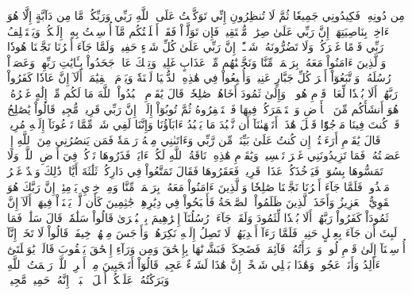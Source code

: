 مِن دُونِهِۦۖ فَكِيدُونِي جَمِيعٗا ثُمَّ لَا تُنظِرُونِ
إِنِّي تَوَكَّلۡتُ عَلَى ٱللَّهِ رَبِّي وَرَبِّكُمۚ مَّا مِن دَآبَّةٍ إِلَّا هُوَ ءَاخِذُۢ بِنَاصِيَتِهَآۚ إِنَّ رَبِّي عَلَىٰ صِرَٰطٖ مُّسۡتَقِيمٖ
فَإِن تَوَلَّوۡاْ فَقَدۡ أَبۡلَغۡتُكُم مَّآ أُرۡسِلۡتُ بِهِۦٓ إِلَيۡكُمۡۚ وَيَسۡتَخۡلِفُ رَبِّي قَوۡمًا غَيۡرَكُمۡ وَلَا تَضُرُّونَهُۥ شَيۡـًٔاۚ إِنَّ رَبِّي عَلَىٰ كُلِّ شَيۡءٍ حَفِيظٞ
وَلَمَّا جَآءَ أَمۡرُنَا نَجَّيۡنَا هُودٗا وَٱلَّذِينَ ءَامَنُواْ مَعَهُۥ بِرَحۡمَةٖ مِّنَّا وَنَجَّيۡنَٰهُم مِّنۡ عَذَابٍ غَلِيظٖ
وَتِلۡكَ عَادٞۖ جَحَدُواْ بِـَٔايَٰتِ رَبِّهِمۡ وَعَصَوۡاْ رُسُلَهُۥ وَٱتَّبَعُوٓاْ أَمۡرَ كُلِّ جَبَّارٍ عَنِيدٖ
وَأُتۡبِعُواْ فِي هَٰذِهِ ٱلدُّنۡيَا لَعۡنَةٗ وَيَوۡمَ ٱلۡقِيَٰمَةِۗ أَلَآ إِنَّ عَادٗا كَفَرُواْ رَبَّهُمۡۗ أَلَا بُعۡدٗا لِّعَادٖ قَوۡمِ هُودٖ
۞وَإِلَىٰ ثَمُودَ أَخَاهُمۡ صَٰلِحٗاۚ قَالَ يَٰقَوۡمِ ٱعۡبُدُواْ ٱللَّهَ مَا لَكُم مِّنۡ إِلَٰهٍ غَيۡرُهُۥۖ هُوَ أَنشَأَكُم مِّنَ ٱلۡأَرۡضِ وَٱسۡتَعۡمَرَكُمۡ فِيهَا فَٱسۡتَغۡفِرُوهُ ثُمَّ تُوبُوٓاْ إِلَيۡهِۚ إِنَّ رَبِّي قَرِيبٞ مُّجِيبٞ
قَالُواْ يَٰصَٰلِحُ قَدۡ كُنتَ فِينَا مَرۡجُوّٗا قَبۡلَ هَٰذَآۖ أَتَنۡهَىٰنَآ أَن نَّعۡبُدَ مَا يَعۡبُدُ ءَابَآؤُنَا وَإِنَّنَا لَفِي شَكّٖ مِّمَّا تَدۡعُونَآ إِلَيۡهِ مُرِيبٖ
قَالَ يَٰقَوۡمِ أَرَءَيۡتُمۡ إِن كُنتُ عَلَىٰ بَيِّنَةٖ مِّن رَّبِّي وَءَاتَىٰنِي مِنۡهُ رَحۡمَةٗ فَمَن يَنصُرُنِي مِنَ ٱللَّهِ إِنۡ عَصَيۡتُهُۥۖ فَمَا تَزِيدُونَنِي غَيۡرَ تَخۡسِيرٖ
وَيَٰقَوۡمِ هَٰذِهِۦ نَاقَةُ ٱللَّهِ لَكُمۡ ءَايَةٗۖ فَذَرُوهَا تَأۡكُلۡ فِيٓ أَرۡضِ ٱللَّهِۖ وَلَا تَمَسُّوهَا بِسُوٓءٖ فَيَأۡخُذَكُمۡ عَذَابٞ قَرِيبٞ
فَعَقَرُوهَا فَقَالَ تَمَتَّعُواْ فِي دَارِكُمۡ ثَلَٰثَةَ أَيَّامٖۖ ذَٰلِكَ وَعۡدٌ غَيۡرُ مَكۡذُوبٖ
فَلَمَّا جَآءَ أَمۡرُنَا نَجَّيۡنَا صَٰلِحٗا وَٱلَّذِينَ ءَامَنُواْ مَعَهُۥ بِرَحۡمَةٖ مِّنَّا وَمِنۡ خِزۡيِ يَوۡمِئِذٍۚ إِنَّ رَبَّكَ هُوَ ٱلۡقَوِيُّ ٱلۡعَزِيزُ
وَأَخَذَ ٱلَّذِينَ ظَلَمُواْ ٱلصَّيۡحَةُ فَأَصۡبَحُواْ فِي دِيَٰرِهِمۡ جَٰثِمِينَ
كَأَن لَّمۡ يَغۡنَوۡاْ فِيهَآۗ أَلَآ إِنَّ ثَمُودَاْ كَفَرُواْ رَبَّهُمۡۗ أَلَا بُعۡدٗا لِّثَمُودَ
وَلَقَدۡ جَآءَتۡ رُسُلُنَآ إِبۡرَٰهِيمَ بِٱلۡبُشۡرَىٰ قَالُواْ سَلَٰمٗاۖ قَالَ سَلَٰمٞۖ فَمَا لَبِثَ أَن جَآءَ بِعِجۡلٍ حَنِيذٖ
فَلَمَّا رَءَآ أَيۡدِيَهُمۡ لَا تَصِلُ إِلَيۡهِ نَكِرَهُمۡ وَأَوۡجَسَ مِنۡهُمۡ خِيفَةٗۚ قَالُواْ لَا تَخَفۡ إِنَّآ أُرۡسِلۡنَآ إِلَىٰ قَوۡمِ لُوطٖ
وَٱمۡرَأَتُهُۥ قَآئِمَةٞ فَضَحِكَتۡ فَبَشَّرۡنَٰهَا بِإِسۡحَٰقَ وَمِن وَرَآءِ إِسۡحَٰقَ يَعۡقُوبَ
قَالَتۡ يَٰوَيۡلَتَىٰٓ ءَأَلِدُ وَأَنَا۠ عَجُوزٞ وَهَٰذَا بَعۡلِي شَيۡخًاۖ إِنَّ هَٰذَا لَشَيۡءٌ عَجِيبٞ
قَالُوٓاْ أَتَعۡجَبِينَ مِنۡ أَمۡرِ ٱللَّهِۖ رَحۡمَتُ ٱللَّهِ وَبَرَكَٰتُهُۥ عَلَيۡكُمۡ أَهۡلَ ٱلۡبَيۡتِۚ إِنَّهُۥ حَمِيدٞ مَّجِيدٞ
